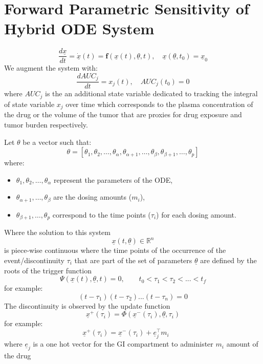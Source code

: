 \documentclass{article}
\begin{document}
\section{Forward Parametric Sensitivity of Hybrid ODE System}
\[
\frac{d\underline{x}}{dt}=\dot{\underline{x}}(t) = \boldsymbol{f}\left(\underline{x}(t),\underline{\theta}, t\right), \quad \underline{x}(\underline{\theta}, t_0) = \underline{x}_0
\]
We augment the system with:
\[
\frac{dAUC_j}{dt} = x_j(t), \quad AUC_j(t_0) = 0
\]
where \(AUC_j\) is the an additional state variable dedicated to tracking the integral of state variable \(x_j\) over time which corresponds to the plasma concentration of the drug or the volume of the tumor that are proxies for drug exposure and tumor burden respectively.

Let \(\theta\) be a vector such that:
\[
\theta = \left[ \theta_1, \theta_2, \ldots, \theta_\alpha, \theta_{\alpha+1}, \ldots, \theta_\beta, \theta_{\beta+1}, \ldots, \theta_p \right]
\]
where:
\begin{itemize}
    \item \(\theta_1, \theta_2, \ldots, \theta_\alpha\) represent the parameters of the ODE,
    \item \(\theta_{\alpha+1}, \ldots, \theta_\beta\) are the dosing amounts ($m_i$),
    \item \(\theta_{\beta+1}, \ldots, \theta_p\) correspond to the time points ($\tau_i$) for each dosing amount.
\end{itemize}

Where the solution to this system 
\[
\underline{x}(t, \underline{\theta}) \in \mathbb{R}^{n}
\]
is piece-wise continuous where the time points of the occurrence of the event/discontinuity $\tau_{i}$ that are part of the set of parameters $\underline{\theta}$ are defined by the roots of the trigger function
\[
\Psi\left(\underline{x}(t),\underline{\theta}, t\right) = 0, \qquad t_0 < \tau_{1} < \tau_{2} < ... < t_f
\]
for example:
\[
(t-\tau_1)(t-\tau_2)...(t-\tau_n) = 0
\]
The discontinuity is observed by the update function
\[
\underline{x}^+(\tau_i) = \Phi\left(\underline{x}^-(\tau_i),\underline{\theta}, \tau_i\right)
\]
for example:
\[
\underline{x}^+(\tau_i) = \underline{x}^-(\tau_i) + \underline{e}_j^\top m_i \qquad 
\]
where $\underline{e}_j$ is a one hot vector for the GI compartment to administer $m_i$ amount of the drug
\end{document}
